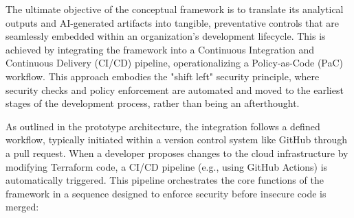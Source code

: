 The ultimate objective of the conceptual framework is to translate its analytical outputs and AI-generated artifacts into tangible, preventative controls that are seamlessly embedded within an organization's development lifecycle. This is achieved by integrating the framework into a Continuous Integration and Continuous Delivery (CI/CD) pipeline, operationalizing a Policy-as-Code (PaC) workflow. This approach embodies the "shift left" security principle, where security checks and policy enforcement are automated and moved to the earliest stages of the development process, rather than being an afterthought.

As outlined in the prototype architecture, the integration follows a defined workflow, typically initiated within a version control system like GitHub through a pull request. When a developer proposes changes to the cloud infrastructure by modifying Terraform code, a CI/CD pipeline (e.g., using GitHub Actions) is automatically triggered. This pipeline orchestrates the core functions of the framework in a sequence designed to enforce security before insecure code is merged:

